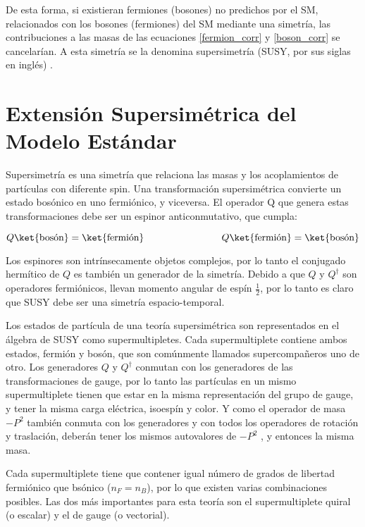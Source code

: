 De esta forma, si existieran fermiones (bosones) no predichos por el SM, relacionados con los bosones (fermiones) del SM mediante una simetría, las contribuciones a las masas de las ecuaciones \ref{fermion_corr} y \ref{boson_corr} se cancelarían. A esta simetría se la denomina supersimetría (SUSY, por sus siglas en inglés) \cite{Martin:1997ns}.


\section{Extensión Supersimétrica del Modelo Estándar}

Supersimetría es una simetría que relaciona las masas y los acoplamientos de partículas con diferente spin. Una transformación supersimétrica convierte un estado bosónico en uno fermiónico, y viceversa. El operador Q que genera estas transformaciones debe ser un espinor anticonmutativo, que cumpla:

\begin{equation}
Q \ket{\text{bosón}} = \ket{\text{fermión}}
\qquad\qquad\qquad\qquad
Q \ket{\text{fermión}} = \ket{\text{bosón}}
\end{equation}

Los espinores son intrínsecamente objetos complejos, por lo tanto el conjugado hermítico de $Q$ es también un generador de la simetría. Debido a que $Q$ y $Q^{\dagger}$ son operadores fermiónicos, llevan momento angular de espín $\frac{1}{2}$, por lo tanto es claro que SUSY debe ser una simetría espacio-temporal.

Los estados de partícula de una teoría supersimétrica son representados en el álgebra de SUSY como supermultipletes. Cada supermultiplete contiene ambos estados, fermión y bosón, que son comúnmente llamados supercompañeros uno de otro. Los generadores $Q$ y $Q^{\dagger}$ conmutan con los generadores de las transformaciones de gauge, por lo tanto las partículas en un mismo supermultiplete tienen que estar en la misma representación del grupo de gauge, y tener la misma carga eléctrica, isoespín y color. Y como el operador de masa $-P^{2}$ también conmuta con los generadores y con todos los operadores de rotación y traslación, deberán tener los mismos autovalores de $-P^{2}$ , y entonces la misma masa.

Cada supermultiplete tiene que contener igual número de grados de libertad fermiónico que bsónico ($n_{F}=n_{B}$), por lo que existen varias combinaciones posibles. Las dos más importantes para esta teoría son el supermultiplete quiral (o escalar) y el de gauge (o vectorial).


